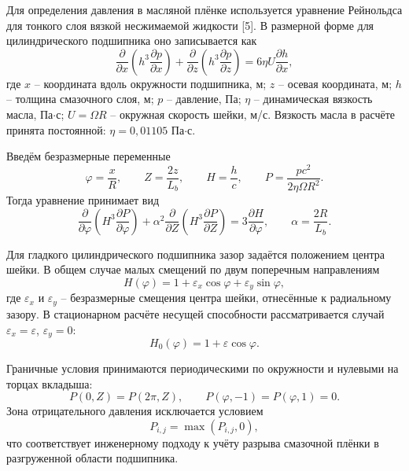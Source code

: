 \documentclass[14pt,a4paper]{extarticle}
\numberwithin{equation}{section}
\numberwithin{figure}{section}
\numberwithin{table}{section}
\begin{document}
Для определения давления в масляной плёнке используется уравнение Рейнольдса для тонкого слоя вязкой несжимаемой жидкости [5]. В размерной форме для цилиндрического подшипника оно записывается как
\begin{equation}
    \frac{\partial}{\partial x}\left(h^3\frac{\partial p}{\partial x}\right)+
    \frac{\partial}{\partial z}\left(h^3\frac{\partial p}{\partial z}\right)=
    6\eta U\frac{\partial h}{\partial x},
    \label{eq:reynolds_dimensional}
\end{equation}
где $x$ -- координата вдоль окружности подшипника, м; $z$ -- осевая координата, м; $h$ -- толщина смазочного слоя, м; $p$ -- давление, Па; $\eta$ -- динамическая вязкость масла, Па$\cdot$с; $U=\Omega R$ -- окружная скорость шейки, м/с. Вязкость масла в расчёте принята постоянной: $\eta=0{,}01105$ Па$\cdot$с.

Введём безразмерные переменные
\begin{equation}
    \varphi=\frac{x}{R},\qquad Z=\frac{2z}{L_b},\qquad
    H=\frac{h}{c},\qquad P=\frac{p c^2}{2\eta\Omega R^2}.
\end{equation}
Тогда уравнение принимает вид
\begin{equation}
    \frac{\partial}{\partial \varphi}\left(H^3\frac{\partial P}{\partial \varphi}\right)+
    \alpha^2\frac{\partial}{\partial Z}\left(H^3\frac{\partial P}{\partial Z}\right)=
    3\frac{\partial H}{\partial \varphi},
    \qquad \alpha=\frac{2R}{L_b}.
    \label{eq:reynolds_dimensionless}
\end{equation}

Для гладкого цилиндрического подшипника зазор задаётся положением центра шейки. В общем случае малых смещений по двум поперечным направлениям
\begin{equation}
    H(\varphi)=1+\varepsilon_x\cos\varphi+\varepsilon_y\sin\varphi,
    \label{eq:clearance_general}
\end{equation}
где $\varepsilon_x$ и $\varepsilon_y$ -- безразмерные смещения центра шейки, отнесённые к радиальному зазору. В стационарном расчёте несущей способности рассматривается случай $\varepsilon_x=\varepsilon$, $\varepsilon_y=0$:
\begin{equation}
    H_0(\varphi)=1+\varepsilon\cos\varphi.
    \label{eq:clearance_static}
\end{equation}

Граничные условия принимаются периодическими по окружности и нулевыми на торцах вкладыша:
\begin{equation}
    P(0,Z)=P(2\pi,Z),\qquad P(\varphi,-1)=P(\varphi,1)=0.
    \label{eq:boundary_conditions}
\end{equation}
Зона отрицательного давления исключается условием
\begin{equation}
    P_{i,j}=\max(P_{i,j},0),
    \label{eq:cavitation_simple}
\end{equation}
что соответствует инженерному подходу к учёту разрыва смазочной плёнки в разгруженной области подшипника.
\end{document}
